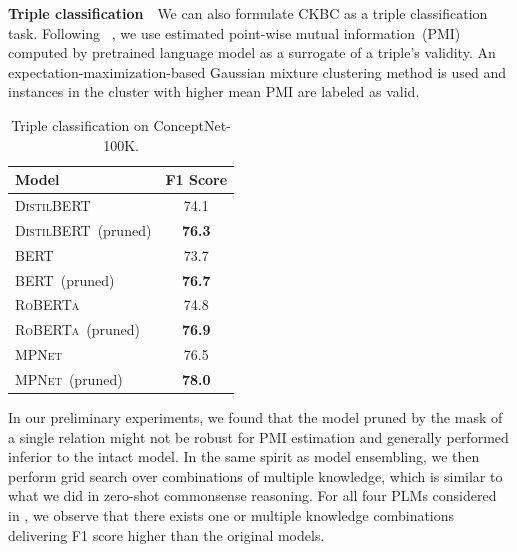 \textbf{Triple classification}~~We can also formulate CKBC as a triple classification task. Following ~\citet{Feldman2020}, we use estimated point-wise mutual information~(PMI) computed by pretrained language model as a surrogate of a triple's validity. An expectation-maximization-based Gaussian mixture clustering method is used and instances in the cluster with higher mean PMI are labeled as valid. 
\begin{table}[t]
	\centering
	\scriptsize
	\begin{tabular}{l|c}
		\toprule
		\textbf{Model} &  \textbf{F1 Score}\\
		\midrule
		\textsc{DistilBERT} & 74.1\\
		\textsc{DistilBERT}~(pruned) & \textbf{76.3}\\
		\midrule
		\textsc{BERT} & 73.7\\
		\textsc{BERT}~(pruned) & \textbf{76.7}\\
		\midrule
		\textsc{RoBERTa} &74.8 \\
		\textsc{RoBERTa}~(pruned) & \textbf{76.9}\\
		\midrule
		\textsc{MPNet} &76.5 \\
		\textsc{MPNet}~(pruned) & \textbf{78.0}\\
		\bottomrule
	\end{tabular}
	\caption{Triple classification on ConceptNet-100K.}
	\label{table:tripleclassification}
\end{table}
In our preliminary experiments, we found that the model pruned by the mask 
of a single relation might not be robust for PMI estimation and generally 
performed inferior to the intact model. 
In the same spirit as model ensembling, we then perform grid search over 
combinations of multiple knowledge, which is similar to what we did 
in zero-shot commonsense reasoning. For all four PLMs considered in 
, we observe that there exists one 
or multiple knowledge combinations delivering F1 score higher than the 
original models. 


